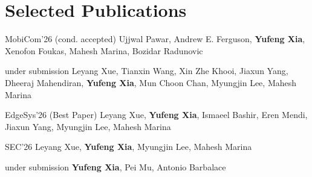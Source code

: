 \section{Selected Publications}
\vspace{2pt}

  {MobiCom'26 (cond. accepted)}
  {Ujjwal Pawar, Andrew E. Ferguson, \textbf{Yufeng Xia}, Xenofon Foukas, Mahesh Marina, Bozidar Radunovic}

  {under submission}
  {Leyang Xue, Tianxin Wang, Xin Zhe Khooi, Jiaxun Yang, Dheeraj Mahendiran, \textbf{Yufeng Xia}, Mun Choon Chan, Myungjin Lee, Mahesh Marina}

  {EdgeSys'26 (Best Paper)}
  {Leyang Xue, \textbf{Yufeng Xia}, Ismaeel Bashir, Eren Mendi, Jiaxun Yang, Myungjin Lee, Mahesh Marina}

  {SEC'26}
  {Leyang Xue, \textbf{Yufeng Xia}, Myungjin Lee, Mahesh Marina}

  {under submission}
  {\textbf{Yufeng Xia}, Pei Mu, Antonio Barbalace}
